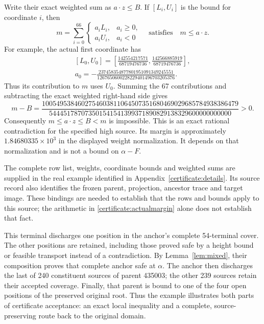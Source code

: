 \documentclass[11pt,reqno]{amsart}
\theoremstyle{definition}
\theoremstyle{remark}
\begin{document}
Write their exact weighted sum as \(a\cdot z\le B\). If
\([L_i,U_i]\) is the bound for coordinate \(i\), then
\begin{equation}\label{certificate:boxminimum}
m=\sum_{i=0}^{66}
\begin{cases}
a_iL_i,&a_i\ge0,\\
a_iU_i,&a_i<0
\end{cases}
\quad\text{satisfies}\quad m\le a\cdot z.
\end{equation}
For example, the actual first coordinate has
\[
\begin{gathered}
[L_0,U_0]=
\left[\frac{142554217571}{68719476736},
      \frac{142566885919}{68719476736}\right],\\
a_0=-\frac{237458354877801951091349245551}
                {1267650600228229401496703205376}.
\end{gathered}
\]
Thus its contribution to \(m\) uses \(U_0\). Summing the 67
contributions and subtracting the exact weighted right-hand side gives
\begin{equation}\label{certificate:actualmargin}
m-B=
\frac{\scriptstyle
1005495384602754603811064507351680469029685784938386479}
{\scriptstyle
544451787073501541541399371890829138329600000000000}
>0.
\end{equation}
Consequently \(m\le a\cdot z\le B<m\) is impossible. This is an
exact rational contradiction for the specified high source. Its margin
is approximately \(1.84680335\times10^3\) in the displayed weight
normalization. It depends on that normalization and is not a bound on
\(\alpha-F\).

The complete row list, weights, coordinate bounds and weighted sums
are supplied in the real example identified in
Appendix~\ref{certificate:details}. Its source record also identifies
the frozen parent, projection, ancestor trace and target image. These
bindings are needed to establish that the rows and bounds apply to
this source; the arithmetic in
\eqref{certificate:actualmargin} alone does not establish that fact.

This terminal discharges one position in the anchor's complete 54-terminal
cover. The other positions are retained, including those proved safe
by a height bound or feasible transport instead of a contradiction.
By Lemma~\ref{lem:mixed}, their composition proves that complete anchor
safe at \(\alpha\). The anchor then discharges the last of 240 constituent
sources of parent 435003; the other 239 sources retain their accepted
coverage. Finally, that parent is bound to one of the four open
positions of the preserved original root. Thus the example illustrates
both parts of certificate acceptance: an exact local inequality and a
complete, source-preserving route back to the original domain.
\end{document}
